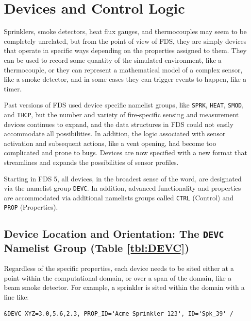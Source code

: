 \documentclass[11pt]{book}
\newcommand{\ct}{\tt\small}
\begin{document}
\clearpage

\chapter{Devices and Control Logic}

Sprinklers, smoke detectors, heat flux gauges, and thermocouples
may seem to be completely unrelated, but from the point of view
of FDS, they are simply devices that operate in specific ways depending
on the properties assigned to them. They can be used to record some
quantity of the simulated environment, like a thermocouple, or they can represent a mathematical model
of a complex sensor, like a smoke detector,
and in some cases they can trigger events to happen, like a timer.

Past versions of FDS used device specific namelist groups, like {\ct SPRK},
{\ct HEAT}, {\ct SMOD}, and {\ct THCP}, but the number and variety
of fire-specific sensing and measurement devices continues to expand, and
the data structures in FDS could not easily accommodate all possibilities.
In addition, the logic associated with sensor activation and
subsequent actions, like a vent opening, had become too complicated and prone to bugs.
Devices are now specified with a new format that streamlines and expands the possibilities of sensor profiles.

Starting in FDS 5, all devices, in the broadest sense of the word,
are designated via the namelist group {\ct DEVC}.
In addition, advanced functionality and properties are accommodated
via additional namelists groups called {\ct CTRL} (Control) and
{\ct PROP} (Properties).




\section{Device Location and Orientation: The \texorpdfstring{{\tt DEVC}}{DEVC} Namelist Group (Table \ref{tbl:DEVC})}
\label{info:DEVC}  

Regardless of the specific properties, each device needs to be sited either at a point within the computational domain, or
over a span of the domain, like a beam smoke detector. For example, a sprinkler is sited within the domain with a line like:

\footnotesize
\begin{verbatim}
&DEVC XYZ=3.0,5.6,2.3, PROP_ID='Acme Sprinkler 123', ID='Spk_39' /
\end{verbatim}
\normalsize
\end{document}
